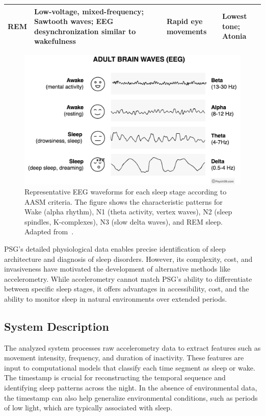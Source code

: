 \documentclass[conference]{IEEEtran}
\begin{document}
\begin{table}[h]
{\begin{tabular}{|p{1.5cm}|p{4.5cm}|p{3.5cm}|p{3cm}|}
			\hline
			REM                                                                                                            &
			Low-voltage, mixed-frequency; Sawtooth waves; EEG desynchronization similar to wakefulness                     &
			Rapid eye movements                                                                                            &
			Lowest tone; Atonia                                                                                                                                                         \\
			\hline
		\end{tabular}%
	}
\end{table}

\begin{figure}[h]
	\centering
	\includegraphics[width=0.65\linewidth]{figures/sleep_stages_eeg_patterns.png}
	\caption{Representative EEG waveforms for each sleep stage according to AASM criteria. The figure shows the characteristic patterns for Wake (alpha rhythm), N1 (theta activity, vertex waves), N2 (sleep spindles, K-complexes), N3 (slow delta waves), and REM sleep. Adapted from~\cite{psychdb2023}.}
	\label{fig:sleep_stages_eeg}
\end{figure}

PSG's detailed physiological data enables precise identification of sleep architecture and diagnosis of sleep disorders. However, its complexity, cost, and invasiveness have motivated the development of alternative methods like accelerometry. While accelerometry cannot match PSG's ability to differentiate between specific sleep stages, it offers advantages in accessibility, cost, and the ability to monitor sleep in natural environments over extended periods.

\subsection{System Description}
The analyzed system processes raw accelerometry data to extract features such as movement intensity, frequency, and duration of inactivity. These features are input to computational models that classify each time segment as sleep or wake. The timestamp is crucial for reconstructing the temporal sequence and identifying sleep patterns across the night. In the absence of environmental data, the timestamp can also help generalize environmental conditions, such as periods of low light, which are typically associated with sleep.
\end{document}
